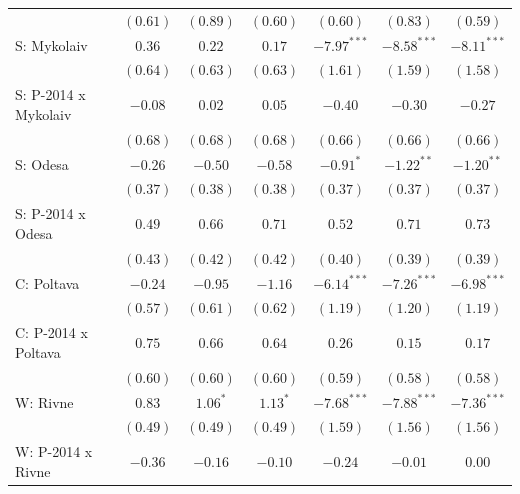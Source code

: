 \begin{table}
\begin{center}
\begin{small}
\begin{tabular}{l c c c c c c}
                            & $(0.61)$      & $(0.89)$       & $(0.60)$       & $(0.60)$       & $(0.83)$       & $(0.59)$       \\
S: Mykolaiv                 & $0.36$        & $0.22$         & $0.17$         & $-7.97^{***}$  & $-8.58^{***}$  & $-8.11^{***}$  \\
                            & $(0.64)$      & $(0.63)$       & $(0.63)$       & $(1.61)$       & $(1.59)$       & $(1.58)$       \\
S: P-2014 x Mykolaiv        & $-0.08$       & $0.02$         & $0.05$         & $-0.40$        & $-0.30$        & $-0.27$        \\
                            & $(0.68)$      & $(0.68)$       & $(0.68)$       & $(0.66)$       & $(0.66)$       & $(0.66)$       \\
S: Odesa                    & $-0.26$       & $-0.50$        & $-0.58$        & $-0.91^{*}$    & $-1.22^{**}$   & $-1.20^{**}$   \\
                            & $(0.37)$      & $(0.38)$       & $(0.38)$       & $(0.37)$       & $(0.37)$       & $(0.37)$       \\
S: P-2014 x Odesa           & $0.49$        & $0.66$         & $0.71$         & $0.52$         & $0.71$         & $0.73$         \\
                            & $(0.43)$      & $(0.42)$       & $(0.42)$       & $(0.40)$       & $(0.39)$       & $(0.39)$       \\
C: Poltava                  & $-0.24$       & $-0.95$        & $-1.16$        & $-6.14^{***}$  & $-7.26^{***}$  & $-6.98^{***}$  \\
                            & $(0.57)$      & $(0.61)$       & $(0.62)$       & $(1.19)$       & $(1.20)$       & $(1.19)$       \\
C: P-2014 x Poltava         & $0.75$        & $0.66$         & $0.64$         & $0.26$         & $0.15$         & $0.17$         \\
                            & $(0.60)$      & $(0.60)$       & $(0.60)$       & $(0.59)$       & $(0.58)$       & $(0.58)$       \\
W: Rivne                    & $0.83$        & $1.06^{*}$     & $1.13^{*}$     & $-7.68^{***}$  & $-7.88^{***}$  & $-7.36^{***}$  \\
                            & $(0.49)$      & $(0.49)$       & $(0.49)$       & $(1.59)$       & $(1.56)$       & $(1.56)$       \\
W: P-2014 x Rivne           & $-0.36$       & $-0.16$        & $-0.10$        & $-0.24$        & $-0.01$        & $0.00$         \\

\end{tabular}
\end{small}
\end{center}
\end{table}
